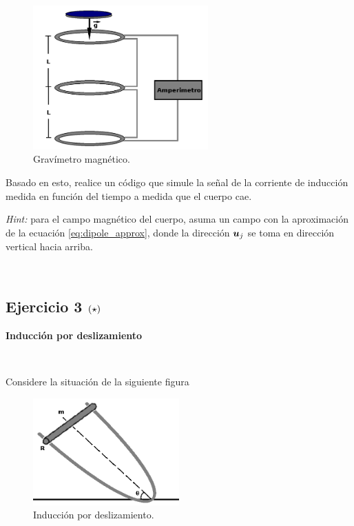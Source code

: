 \newpage
\begin{figure}[htbp]
	\centering
	\includegraphics[width=0.6\textwidth]
	{./pictures/gravimeter.png}

	\caption{\small{Gravímetro magnético.}}
	
	\label{fig:gravimeter}
\end{figure}

Basado en esto, realice un código que simule la señal de la corriente de 
inducción medida en función del tiempo a medida que el cuerpo cae. 

\textit{Hint:} para el campo magnético del cuerpo, asuma un campo con la 
aproximación de la ecuación \ref{eq:dipole_approx}, donde la dirección
$\boldsymbol{ u }_j$ se toma en dirección vertical hacia arriba.


\

\subsection*{Ejercicio 3 \large{$\left( \star \right)$}}

\textbf{Inducción por deslizamiento}

\

Considere la situación de la siguiente figura

\begin{figure}[htbp]
	\centering
	\includegraphics[width=0.5\textwidth]
	{./pictures/induction.png}

	\caption{\small{Inducción por deslizamiento.}}
	
	\label{fig:induction_fall}
\end{figure}

